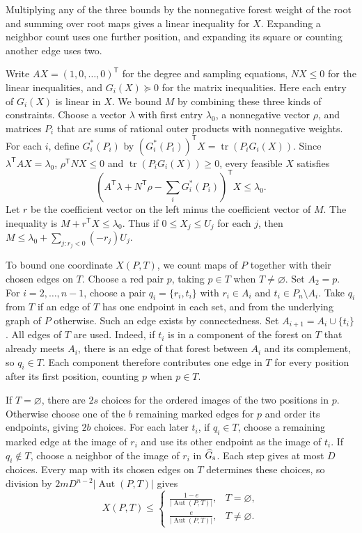 \documentclass[preprint,11pt,numbers]{elsarticle-arxiv}
\numberwithin{equation}{section}
\theoremstyle{definition}
\DeclareMathOperator{\tr}{tr}
\begin{document}
Multiplying any of the three bounds by the nonnegative forest
weight of the root and summing over root maps gives a linear
inequality for $X$. Expanding a neighbor count uses one further
position, and expanding its square or counting another edge uses
two.

Write $AX=(1,0,\ldots,0)^{\mathsf T}$ for the degree and sampling
equations, $NX\leq0$ for the linear inequalities, and
$G_i(X)\succeq0$ for the matrix inequalities. Here each entry of
$G_i(X)$ is linear in $X$. We bound $M$ by combining these three
kinds of constraints. Choose a vector $\lambda$ with first entry
$\lambda_0$, a nonnegative vector $\rho$, and matrices $P_i$
that are sums of rational outer products with nonnegative weights.
For each $i$, define $G_i^*(P_i)$ by
$(G_i^*(P_i))^{\mathsf T}X=\tr(P_iG_i(X))$. Since
$\lambda^{\mathsf T}AX=\lambda_0$, $\rho^{\mathsf T}NX\leq0$ and
$\tr(P_iG_i(X))\geq0$, every feasible $X$ satisfies
\[
 \left(A^{\mathsf T}\lambda+N^{\mathsf T}\rho
        -\sum_iG_i^*(P_i)\right)^{\mathsf T}X
 \le\lambda_0 .
\]
Let $r$ be the coefficient vector on the left minus the coefficient
vector of $M$. The inequality is $M+r^{\mathsf T}X\leq\lambda_0$.
Thus if $0\leq X_j\leq U_j$ for each $j$, then
$M\leq\lambda_0+\sum_{j:r_j<0}(-r_j)U_j$.

To bound one coordinate $X(P,T)$, we count maps of $P$ together
with their chosen edges on $T$. Choose a red pair $p$, taking
$p\in T$ when $T\ne\varnothing$. Set $A_2=p$. For
$i=2,\ldots,n-1$, choose a pair $q_i=\{r_i,t_i\}$ with
$r_i\in A_i$ and $t_i\in P_n\setminus A_i$. Take $q_i$ from $T$
if an edge of $T$ has one endpoint in each set, and from the
underlying graph of $P$ otherwise. Such an edge exists by
connectedness. Set $A_{i+1}=A_i\cup\{t_i\}$. All edges of $T$
are used. Indeed, if $t_i$ is in a component of the forest
on $T$ that already meets $A_i$, there is an edge of that forest
between $A_i$ and its complement, so $q_i\in T$. Each component
therefore contributes one edge in $T$ for every position after
its first position, counting $p$ when $p\in T$.

If $T=\varnothing$, there are $2s$ choices for the ordered
images of the two positions in $p$. Otherwise choose one of the
$b$ remaining marked edges for $p$ and order its endpoints,
giving $2b$ choices. For each later $t_i$, if $q_i\in T$,
choose a remaining marked edge at the image of $r_i$ and
use its other endpoint as the image of $t_i$. If $q_i\notin T$,
choose a neighbor of the image of $r_i$ in $\widehat G_{\rm s}$.
Each step gives at most $D$ choices. Every map with its chosen
edges on $T$ determines these choices, so division by
$2mD^{n-2}|\operatorname{Aut}(P,T)|$ gives
\[
 X(P,T)\leq
 \begin{cases}
 \displaystyle\frac{1-e}{|\operatorname{Aut}(P,T)|},&T=\varnothing,\\[4pt]
 \displaystyle\frac{e}{|\operatorname{Aut}(P,T)|},&T\ne\varnothing.
 \end{cases}
\]
\end{document}
